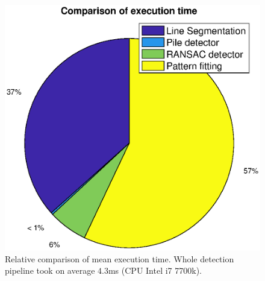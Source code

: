 \begin{figure}[H]
	\centering
	\includegraphics[scale=0.65]{fig/time.eps}
	\caption[Experiment time comparison]{Relative comparison of mean execution time. Whole detection pipeline took on average $4.3$ms (CPU Intel i7 7700k).}
	\label{fig:time}
\end{figure}

